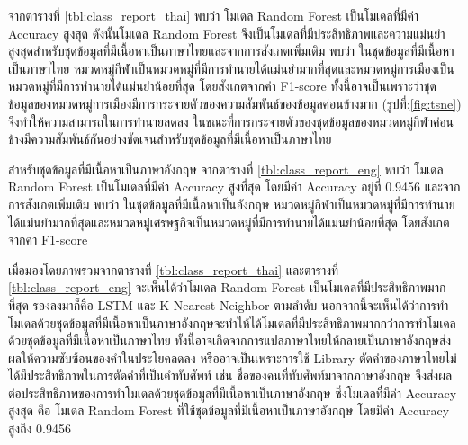 \documentclass[12pt,oneside,openright,a4paper]{cpe-thai-project}
\begin{document}
\begin{itemize}
\begin{longtable}[!ht]{lccccccccc}
      \end{longtable}
      \hspace{1cm}จากตารางที่ \ref{tbl:class_report_thai} พบว่า โมเดล Random Forest เป็นโมเดลที่มีค่า Accuracy สูงสุด ดังนั้นโมเดล Random Forest
      จึงเป็นโมเดลที่มีประสิทธิภาพและความแม่นยำสูงสุดสำหรับชุดข้อมูลที่มีเนื้อหาเป็นภาษาไทยและจากการสังเกตเพิ่มเติม พบว่า ในชุดข้อมูลที่มีเนื้อหาเป็นภาษาไทย
      หมวดหมู่กีฬาเป็นหมวดหมู่ที่มีการทำนายได้แม่นยำมากที่สุดและหมวดหมู่การเมืองเป็นหมวดหมู่ที่มีการทำนายได้แม่นยำน้อยที่สุด โดยสังเกตจากค่า F1-score
      ทั้งนี้อาจเป็นเพราะว่าชุดข้อมูลของหมวดหมู่การเมืองมีการกระจายตัวของความสัมพันธ์ของข้อมูลค่อนข้างมาก (รูปที่:\ref{fig:tsne}) 
      จึงทำให้ความสามารถในการทำนายลดลง ในขณะที่การกระจายตัวของชุดข้อมูลของหมวดหมู่กีฬาค่อนข้างมีความสัมพันธ์กันอย่างชัดเจนสำหรับชุดข้อมูลที่มีเนื้อหาเป็นภาษาไทย 

      \hspace{1cm}สำหรับชุดข้อมูลที่มีเนื้อหาเป็นภาษาอังกฤษ จากตารางที่ \ref{tbl:class_report_eng} พบว่า โมเดล Random Forest 
      เป็นโมเดลที่มีค่า Accuracy สูงที่สุด โดยมีค่า Accuracy อยู่ที่ 0.9456 และจากการสังเกตเพิ่มเติม พบว่า ในชุดข้อมูลที่มีเนื้อหาเป็นอังกฤษ
      หมวดหมู่กีฬาเป็นหมวดหมู่ที่มีการทำนายได้แม่นยำมากที่สุดและหมวดหมู่เศรษฐกิจเป็นหมวดหมู่ที่มีการทำนายได้แม่นยำน้อยที่สุด โดยสังเกตจากค่า F1-score
      
      \hspace{1cm}เมื่อมองโดยภาพรวมจากตารางที่ \ref{tbl:class_report_thai} และตารางที่ \ref{tbl:class_report_eng} 
      จะเห็นได้ว่าโมเดล Random Forest เป็นโมเดลที่มีประสิทธิภาพมากที่สุด รองลงมาก็คือ LSTM และ K-Nearest Neighbor ตามลำดับ
      นอกจากนี้จะเห็นได้ว่าการทำโมเดลด้วยชุดข้อมูลที่มีเนื้อหาเป็นภาษาอังกฤษจะทำให้ได้โมเดลที่มีประสิทธิภาพมากกว่าการทำโมเดลด้วยชุดข้อมูลที่มีเนื้อหาเป็นภาษาไทย 
      ทั้งนี้อาจเกิดจากการแปลภาษาไทยให้กลายเป็นภาษาอังกฤษส่งผลให้ความซับซ้อนของคำในประโยคลดลง 
      หรืออาจเป็นเพราะการใช้ Library ตัดคำของภาษาไทยไม่ได้มีประสิทธิภาพในการตัดคำที่เป็นคำทับศัพท์ เช่น ชื่อของคนที่ทับศัพท์มาจากภาษาอังกฤษ 
      จึงส่งผลต่อประสิทธิภาพของการทำโมเดลด้วยชุดข้อมูลที่มีเนื้อหาเป็นภาษาอังกฤษ
      ซึ่งโมเดลที่มีค่า Accuracy สูงสุด คือ โมเดล Random Forest ที่ใช้ชุดข้อมูลที่มีเนื้อหาเป็นภาษาอังกฤษ โดยมีค่า Accuracy สูงถึง 0.9456
      \newpage


\end{itemize}
\end{document}
